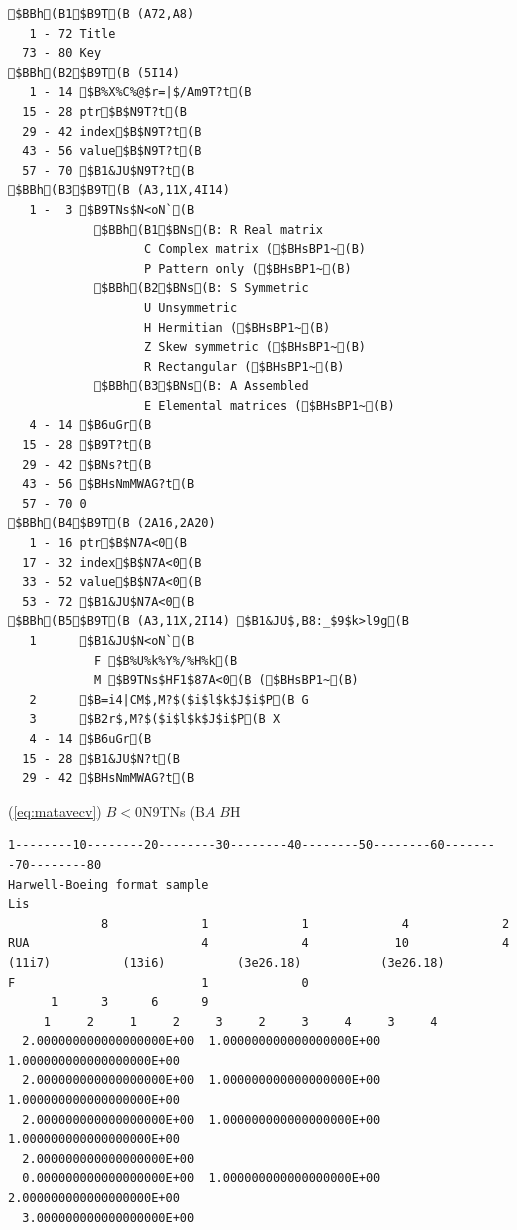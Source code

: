\documentclass[a4paper]{jarticle}
\begin{document}
{{{{\small
\begin{verbatim}
$BBh(B1$B9T(B (A72,A8)
   1 - 72 Title
  73 - 80 Key
$BBh(B2$B9T(B (5I14)
   1 - 14 $B%X%C%@$r=|$/Am9T?t(B
  15 - 28 ptr$B$N9T?t(B
  29 - 42 index$B$N9T?t(B
  43 - 56 value$B$N9T?t(B
  57 - 70 $B1&JU$N9T?t(B
$BBh(B3$B9T(B (A3,11X,4I14)
   1 -  3 $B9TNs$N<oN`(B
            $BBh(B1$BNs(B: R Real matrix
                   C Complex matrix ($BHsBP1~(B)
                   P Pattern only ($BHsBP1~(B)
            $BBh(B2$BNs(B: S Symmetric
                   U Unsymmetric
                   H Hermitian ($BHsBP1~(B)
                   Z Skew symmetric ($BHsBP1~(B)
                   R Rectangular ($BHsBP1~(B)
            $BBh(B3$BNs(B: A Assembled
                   E Elemental matrices ($BHsBP1~(B)
   4 - 14 $B6uGr(B
  15 - 28 $B9T?t(B
  29 - 42 $BNs?t(B
  43 - 56 $BHsNmMWAG?t(B
  57 - 70 0
$BBh(B4$B9T(B (2A16,2A20)
   1 - 16 ptr$B$N7A<0(B
  17 - 32 index$B$N7A<0(B
  33 - 52 value$B$N7A<0(B
  53 - 72 $B1&JU$N7A<0(B
$BBh(B5$B9T(B (A3,11X,2I14) $B1&JU$,B8:_$9$k>l9g(B
   1      $B1&JU$N<oN`(B
            F $B%U%k%Y%/%H%k(B
            M $B9TNs$HF1$87A<0(B ($BHsBP1~(B)
   2      $B=i4|CM$,M?$($i$l$k$J$i$P(B G
   3      $B2r$,M?$($i$l$k$J$i$P(B X
   4 - 14 $B6uGr(B
  15 - 28 $B1&JU$N?t(B
  29 - 42 $BHsNmMWAG?t(B
\end{verbatim}
}

(\ref{eq:matavecv})$B<0$N9TNs(B$A$$B$H%

{\small
\begin{verbatim}
1--------10--------20--------30--------40--------50--------60--------70--------80
Harwell-Boeing format sample                                            Lis
             8             1             1             4             2
RUA                        4             4            10             4
(11i7)          (13i6)          (3e26.18)           (3e26.18)
F                          1             0
      1      3      6      9
     1     2     1     2     3     2     3     4     3     4
  2.000000000000000000E+00  1.000000000000000000E+00  1.000000000000000000E+00
  2.000000000000000000E+00  1.000000000000000000E+00  1.000000000000000000E+00
  2.000000000000000000E+00  1.000000000000000000E+00  1.000000000000000000E+00
  2.000000000000000000E+00
  0.000000000000000000E+00  1.000000000000000000E+00  2.000000000000000000E+00
  3.000000000000000000E+00
\end{verbatim}
}

}}}
\end{document}
